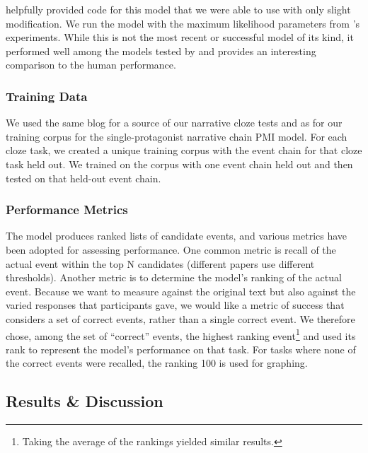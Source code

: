 \documentclass[10pt,a4paper]{article}
\begin{document}
 helpfully provided code for this model that we were able to use with only slight modification.
We run the model with the maximum likelihood parameters from 's experiments.
While this is not the most recent or successful model of its kind, it performed well among the models tested by  and provides an interesting comparison to the human performance.

\subsubsection{Training Data}


We used the same blog for a source of our narrative cloze tests and as for our training corpus for the single-protagonist narrative chain PMI model. For each cloze task, we created a unique training corpus with the event chain for that cloze task held out. We trained on the corpus with one event chain held out and then tested on that held-out event chain.

\subsubsection{Performance Metrics}

The model produces ranked lists of candidate events, and various metrics have been adopted for assessing performance.
One common metric is recall of the actual event within the top N candidates (different papers use different thresholds). Another metric is to determine the model's ranking of the actual event. Because we want to measure against the original text but also against the varied responses that participants gave, we would like a metric of success that considers a set of correct events, rather than a single correct event. We therefore chose, among the set of ``correct'' events, the highest ranking event\footnote{Taking the average of the rankings yielded similar results.} and used its rank to represent the model's performance on that task. For tasks where none of the correct events were recalled, the ranking 100 is used for graphing.

\subsection{Results \& Discussion}
\end{document}
